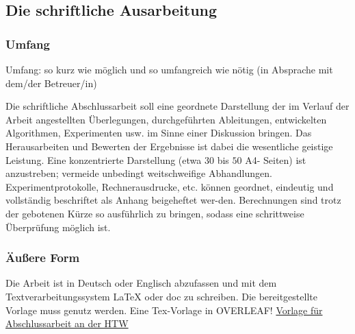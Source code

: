 \subsection{Die schriftliche Ausarbeitung}



\subsubsection{Umfang}
Umfang: so kurz wie möglich und so umfangreich wie nötig (in Absprache mit dem/der Betreuer/in)

Die schriftliche Abschlussarbeit soll eine geordnete Darstellung der im Verlauf der Arbeit angestellten Überlegungen, durchgeführten Ableitungen, entwickelten Algorithmen, Experimenten usw. im Sinne einer Diskussion bringen. Das Herausarbeiten und Bewerten der Ergebnisse ist dabei die wesentliche geistige Leistung. Eine konzentrierte Darstellung (etwa $30$ bis $50$ A4- Seiten) ist anzustreben; vermeide unbedingt weitschweifige Abhandlungen. Experimentprotokolle, Rechnerausdrucke, etc. können geordnet, eindeutig und vollständig beschriftet als Anhang beigeheftet wer-den. Berechnungen sind trotz der gebotenen Kürze so ausführlich zu bringen, sodass eine schrittweise Überprüfung möglich ist.

\subsubsection{Äußere Form}

Die Arbeit ist in Deutsch oder Englisch abzufassen und mit dem Textverarbeitungssystem LaTeX oder doc zu schreiben. Die bereitgestellte Vorlage muss genutz werden.
Eine Tex-Vorlage in OVERLEAF!
\hyperlink{https://www.overleaf.com/project/629f45ce28c12f2c468b8f78}{
Vorlage für Abschlussarbeit an der HTW}

